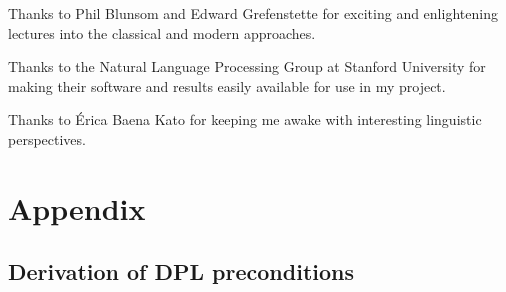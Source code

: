 \documentclass[12pt]{article}
\let\stdsection\section
\renewcommand\section{\newpage\stdsection}
\begin{document}
Thanks to Phil Blunsom and Edward Grefenstette for exciting and enlightening lectures into the classical and modern approaches.

Thanks to the Natural Language Processing Group at Stanford University for making their software and results easily available for use in my project\cite{klein2003accurate}.

Thanks to Érica Baena Kato for keeping me awake with interesting linguistic perspectives.
\newpage
\section{Appendix}
\subsection{Derivation of DPL preconditions}
\end{document}
